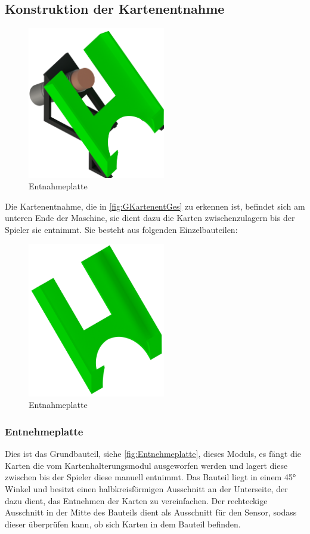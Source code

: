 \subsection{Konstruktion der Kartenentnahme}
\begin{figure}[H]
    \centering
    \includegraphics[width = 6cm]{fig/mech/AusgabeKomlett}
    \caption{Entnahmeplatte}
    \label{fig:GKartenentGes}
\end{figure}
Die Kartenentnahme, die in \autoref{fig:GKartenentGes} zu erkennen ist, befindet sich am unteren Ende der Maschine, sie dient dazu die Karten zwischenzulagern bis der Spieler
sie entnimmt. Sie besteht aus folgenden Einzelbauteilen:\\

\begin{figure}
    \includegraphics[width = 6cm]{fig/mech/Ausgabefach.png}
    \caption{Entnahmeplatte}
    \label{fig:Entnehmeplatte}
\end{figure}
\subsubsection{Entnehmeplatte}

Dies ist das Grundbauteil, siehe \autoref{fig:Entnehmeplatte}, dieses Moduls, es fängt die Karten die vom Kartenhalterungsmodul ausgeworfen werden und lagert diese zwischen bis
der Spieler diese manuell entnimmt. Das Bauteil liegt in einem 45° Winkel und besitzt einen halbkreisförmigen Ausschnitt
an der Unterseite, der dazu dient, das Entnehmen der Karten zu vereinfachen. Der rechteckige Ausschnitt in der Mitte des
Bauteils dient als Ausschnitt für den Sensor, sodass dieser überprüfen kann, ob sich Karten in dem Bauteil befinden.


